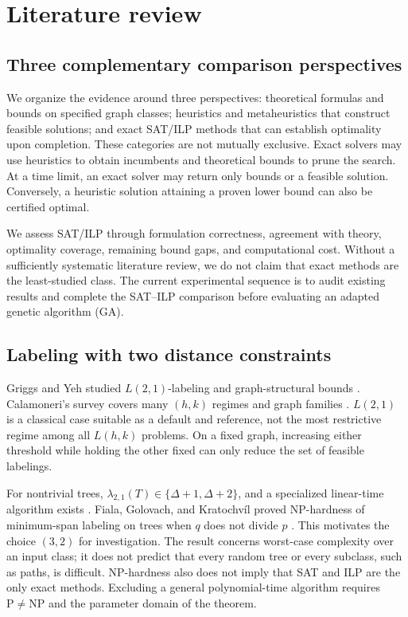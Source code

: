 \section{Literature review}
\subsection{Three complementary comparison perspectives}
We organize the evidence around three perspectives: theoretical formulas
and bounds on specified graph classes; heuristics and metaheuristics that
construct feasible solutions; and exact SAT/ILP methods that can establish
optimality upon completion. These categories are not mutually exclusive.
Exact solvers may use heuristics to obtain incumbents and theoretical bounds
to prune the search. At a time limit, an exact solver may return only bounds
or a feasible solution. Conversely, a heuristic solution attaining a proven
lower bound can also be certified optimal.

We assess SAT/ILP through formulation correctness, agreement with theory,
optimality coverage, remaining bound gaps, and computational cost. Without
a sufficiently systematic literature review, we do not claim that exact
methods are the least-studied class. The current experimental sequence is
to audit existing results and complete the SAT--ILP comparison before
evaluating an adapted genetic algorithm (GA).

\subsection{Labeling with two distance constraints}
Griggs and Yeh studied $L(2,1)$-labeling and graph-structural bounds
\cite{griggs}. Calamoneri's survey covers many $(h,k)$ regimes and graph
families \cite{calamoneri}. $L(2,1)$ is a classical case suitable as a default
and reference, not the most restrictive regime among all $L(h,k)$ problems.
On a fixed graph, increasing either threshold while holding the other fixed
can only reduce the set of feasible labelings.

For nontrivial trees, $\lambda_{2,1}(T)\in\{\Delta+1,\Delta+2\}$, and a
specialized linear-time algorithm exists \cite{hasunuma}. Fiala, Golovach,
and Kratochvíl proved NP-hardness of minimum-span labeling on trees when
$q$ does not divide $p$ \cite{fiala2008trees}. This motivates the choice
$(3,2)$ for investigation. The result concerns worst-case complexity over
an input class; it does not predict that every random tree or every subclass,
such as paths, is difficult. NP-hardness also does not imply that SAT and ILP
are the only exact methods. Excluding a general polynomial-time algorithm
requires $\mathrm{P}\ne\mathrm{NP}$ and the parameter domain of the theorem.

